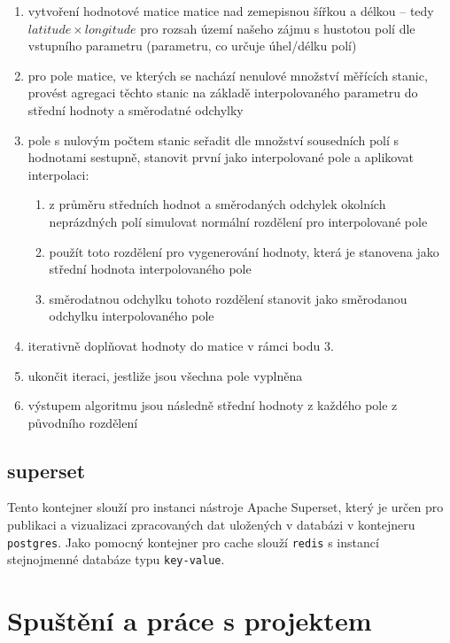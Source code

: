 \documentclass[10pt,a4paper,titlepage]{extarticle}
\begin{document}
    \begin{enumerate}
        \item vytvoření hodnotové matice matice nad zemepisnou šířkou a délkou -- tedy $latitude \times longitude$ pro
        rozsah území našeho zájmu s hustotou polí dle vstupního parametru (parametru, co určuje úhel/délku
        polí)
        \item pro pole matice, ve kterých se nachází nenulové množství měřících stanic, provést agregaci těchto stanic
        na základě interpolovaného parametru do střední hodnoty a směrodatné odchylky
        \item pole s nulovým počtem stanic seřadit dle množství sousedních polí s hodnotami sestupně, stanovit první
        jako interpolované pole a aplikovat interpolaci:
        \begin{enumerate}
            \item z průměru středních hodnot a směrodaných odchylek okolních neprázdných polí simulovat normální
            rozdělení pro interpolované pole
            \item použít toto rozdělení pro vygenerování hodnoty, která je stanovena jako střední hodnota
            interpolovaného pole
            \item směrodatnou odchylku tohoto rozdělení stanovit jako směrodanou odchylku interpolovaného pole
        \end{enumerate}
        \item iterativně doplňovat hodnoty do matice v rámci bodu 3.
        \item ukončit iteraci, jestliže jsou všechna pole vyplněna
        \item výstupem algoritmu jsou následně střední hodnoty z každého pole z původního rozdělení
    \end{enumerate}

    \subsection{superset}

    Tento kontejner slouží pro instanci nástroje Apache Superset, který je určen pro publikaci a vizualizaci
    zpracovaných dat uložených v databázi v kontejneru \texttt{postgres}. Jako pomocný kontejner pro cache slouží
    \texttt{redis} s instancí stejnojmenné databáze typu \texttt{key-value}.

    \section{Spuštění a práce s projektem}
\end{document}

